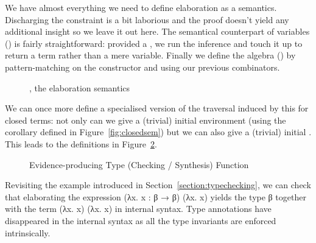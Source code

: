 We have almost everything we need to define elaboration as a semantics. Discharging
the  constraint is a bit laborious and the proof doesn't
yield any additional insight so we leave it out here. The semantical counterpart of
variables () is fairly straightforward: provided a , we run the
inference and touch it up to return a term rather than a mere variable. Finally we
define the algebra () by pattern-matching on the constructor and using our
previous combinators.

\begin{figure}[h]
  \caption{, the elaboration semantics\label{defn:Elaborate}}
\end{figure}

We can once more define a specialised version of the traversal induced by this
 for closed terms: not only can we give a (trivial) initial
environment (using the  corollary defined in Figure~\ref{fig:closedsem})
but we can also give a (trivial) initial . This leads to the
definitions in Figure~\ref{fig:typedelaboration}.

\begin{figure}[h]
\caption{Evidence-producing Type (Checking / Synthesis) Function}
\label{fig:typedelaboration}
\end{figure}

Revisiting the example introduced in Section~\ref{section:typechecking},
we can check that elaborating the expression {(λx. x : β → β) (λx. x)}
yields the type {β} together with the term {(λx. x) (λx. x)} in internal
syntax. Type annotations have disappeared in the internal syntax as all
the type invariants are enforced intrinsically.

\begin{figure}[h]
\end{figure}
